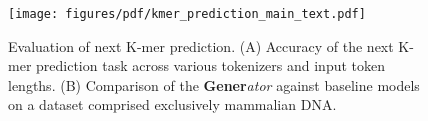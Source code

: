 \begin{figure}[t]
    \centering
    \texttt{[image: figures/pdf/kmer\_prediction\_main\_text.pdf]}
    \caption{Evaluation of next K-mer prediction. (A) Accuracy of the next K-mer prediction task across various tokenizers and input token lengths. (B) Comparison of the \textbf{Gener}\textit{ator} against baseline models on a dataset comprised exclusively mammalian DNA.}
    \label{fig:kmer_main}
\end{figure}